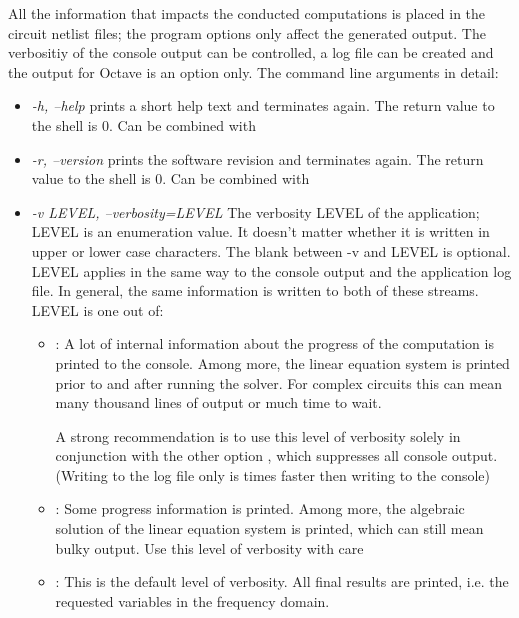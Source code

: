 All the information that impacts the conducted computations is placed in
the circuit netlist files; the program options only affect the generated
output. The verbositiy of the console output can be controlled, a log file
can be created and the output for Octave is an option only. The command
line arguments in detail:
\begin{itemize}
  \item \emph{-h, --help}
    \linnet{} prints a short help text and terminates again. The return
    value to the shell is 0. Can be combined with 
  \item \emph{-r, --version}
    \linnet{} prints the software revision and terminates again. The
    return value to the shell is 0. Can be combined with 
  \item \emph{-v LEVEL, --verbosity=LEVEL}
    The verbosity LEVEL of the application; LEVEL is an enumeration value.
    It doesn't matter whether it is written in upper or lower case
    characters. The blank between \mbox{-v} and LEVEL is optional. LEVEL
    applies in the same way to the console output and the application log
    file. In general, the same information is written to both of these
    streams. LEVEL is one out of:
    \begin{itemize}
      \item {}: A lot of internal information about the progress
        of the computation is printed to the console. Among more, the
        linear equation system is printed prior to and after running the
        solver. For complex circuits this can mean many thousand lines of
        output or much time to wait.
        
        A strong recommendation is to use this level of verbosity solely
        in conjunction with the other option , which suppresses
        all console output. (Writing to the log file only is times faster
        then writing to the console)
        
      \item {}: Some progress information is printed. Among more,
        the algebraic solution of the linear equation system is printed,
        which can still mean bulky output. Use this level of verbosity
        with care 
        
      \item {}: This is the default level of verbosity. All
        final results are printed, i.e. the requested variables in the
        frequency domain.
        

\end{itemize}
\end{itemize}
